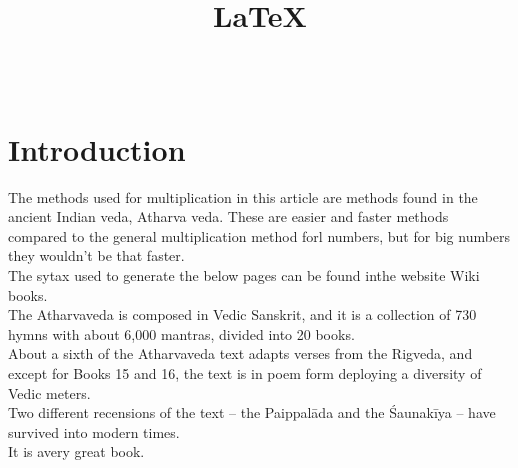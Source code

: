 \documentclass[12pt,a4paper]{article}
\title{\LaTeX}
\author{
	\hspace{4in}{Dheeraj Athrey}\\
}
\begin{document}
\maketitle


\section*{Introduction}


The methods used for multiplication in this article are methods found in the ancient Indian veda, Atharva veda\cite{bloomfield1899atharvaveda}\cite{India1000shaping}. These are easier and faster methods compared to the general multiplication method forl numbers, but for big numbers they wouldn't be that faster.\\
The sytax used to generate the below pages can be found inthe website Wiki books\cite{website:Wikibooks}.\\


The Atharvaveda is composed in Vedic Sanskrit, and it is a collection of 730 hymns with about 6,000 mantras, divided into 20 books.\\
About a sixth of the Atharvaveda text adapts verses from the Rigveda, and except for Books 15 and 16, the text is in poem form deploying a diversity of Vedic meters.\\

Two different recensions of the text – the Paippalāda and the Śaunakīya – have survived into modern times.\\
It is avery great book.\\





\end{document}
